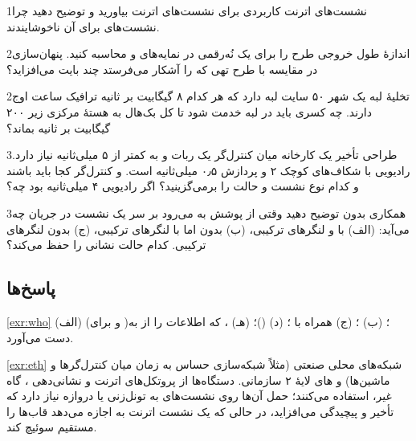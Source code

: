 \documentclass[11pt,a4paper]{article}
\begin{document}
\begin{exercisebox}{1}{نشست‌های اترنت}\label{exr:eth}
کاربردی برای نشست‌های  اترنت بیاورید و توضیح دهید چرا نشست‌های  برای آن ناخوشایندند.
\end{exercisebox}

\begin{exercisebox}{2}{اندازهٔ }\label{exr:suci}
طول خروجی طرح را برای یک  نُه‌رقمی در نمایه‌های  و  محاسبه کنید. پنهان‌سازی در مقایسه با طرح تهی که
 را آشکار می‌فرستد چند بایت می‌افزاید؟
\end{exercisebox}

\begin{exercisebox}{2}{تخلیهٔ لبه}\label{exr:offload}
یک شهر ۵۰ سایت لبه دارد که هر کدام ۸ گیگابیت بر ثانیه ترافیک ساعت اوج دارند. چه کسری باید در لبه خدمت شود تا کل بک‌هال به هستهٔ
مرکزی زیر ۲۰۰ گیگابیت بر ثانیه بماند؟
\end{exercisebox}

\begin{exercisebox}{3}{طراحی تأخیر}\label{exr:latency}
یک کارخانه میان کنترل‌گر یک ربات و  به  کمتر از ۵ میلی‌ثانیه نیاز دارد.  رادیویی با شکاف‌های کوچک ۲ و پردازش
۰٫۵ میلی‌ثانیه است.  و کنترل‌گر کجا باید باشند و کدام نوع نشست و حالت  را برمی‌گزینید؟ اگر  رادیویی ۴
میلی‌ثانیه بود چه؟
\end{exercisebox}

\begin{exercisebox}{3}{همکاری بدون }\label{exr:n26}
توضیح دهید وقتی  از پوشش  به  می‌رود بر سر یک نشست  در جریان چه می‌آید: (الف) با  و
لنگرهای ترکیبی، (ب) بدون  اما با لنگرهای ترکیبی، (ج) بدون لنگرهای ترکیبی. کدام حالت نشانی  را حفظ می‌کند؟
\end{exercisebox}

\subsection*{پاسخ‌ها}

\begin{solutionbox}{\ref{exr:who}}
(الف)  (و  برای )؛ (ب) ؛ (ج)  همراه با ؛ (د) 
()؛ (هـ) ، که اطلاعات را از  به دست می‌آورد.
\end{solutionbox}

\begin{solutionbox}{\ref{exr:eth}}
شبکه‌های محلی صنعتی (مثلاً شبکه‌سازی حساس به زمان میان کنترل‌گرها و ماشین‌ها) و های لایهٔ ۲ سازمانی. دستگاه‌ها از
پروتکل‌های اترنت و نشانی‌دهی ، گاه غیر، استفاده می‌کنند؛ حمل آن‌ها روی نشست‌های  به تونل‌زنی یا دروازه
نیاز دارد که تأخیر و پیچیدگی می‌افزاید، در حالی که یک نشست اترنت به  اجازه می‌دهد قاب‌ها را مستقیم سوئیچ کند.
\end{solutionbox}
\end{document}
